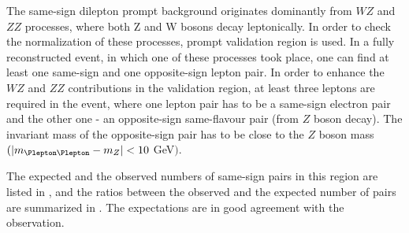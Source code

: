 The same-sign dilepton prompt background originates dominantly from $WZ$ and $ZZ$ processes, where both Z and W bosons decay leptonically.
In order to check the normalization of these processes, prompt validation region is used.
In a fully reconstructed event, in which one of these processes took place, one can find at least one same-sign and one opposite-sign lepton pair.
In order to enhance the $WZ$ and $ZZ$ contributions in the validation region, at least three leptons are required in the event, where one lepton pair
has to be a same-sign electron pair and the other one - an opposite-sign same-flavour pair (from $Z$ boson decay). 
The invariant mass of the opposite-sign pair has to be close to the $Z$ boson mass $(|m_{\Plepton\Plepton} - m_{Z}| < 10$ GeV$)$.

The expected and the observed numbers of same-sign pairs in this region are listed in , 
and the ratios between the observed and the expected number of pairs are summarized in . 
The expectations are in good agreement with the observation.

\begin{table*}[htbp]
\begin{center}
\end{center}
\caption{Expected and observed numbers of pairs for various cuts on the dilepton invariant mass. The uncertainties shown are quadratic sums of the statistical and systematic uncertainties.}
\label{tab:promptCR_yields}
\end{table*}

